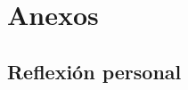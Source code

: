 \leftskip 0in
\parindent 0.49cm %
\newpage
\section{Anexos}

\subsection{Reflexión personal}
%
%
%

